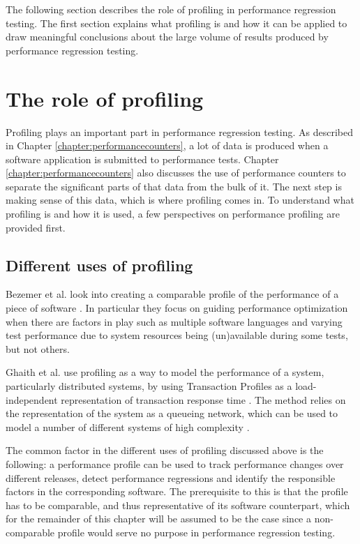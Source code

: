 The following section describes the role of profiling in performance regression testing. The first section explains what profiling is and how it can be applied to draw meaningful conclusions about the large volume of results produced by performance regression testing.

\section{The role of profiling}
Profiling plays an important part in performance regression testing. As described in Chapter \ref{chapter:performancecounters}, a lot of data is produced when a software application is submitted to performance tests. Chapter \ref{chapter:performancecounters} also discusses the use of performance counters to separate the significant parts of that data from the bulk of it. The next step is making sense of this data, which is where profiling comes in. To understand what profiling is and how it is used, a few perspectives on performance profiling are provided first.

\subsection{Different uses of profiling}
Bezemer et al. look into creating a comparable profile of the performance of a piece of software \cite{io_regressions}. In particular they focus on guiding performance optimization when there are factors in play such as multiple software languages and varying test performance due to system resources being (un)available during some tests, but not others.

Ghaith et al. use profiling as a way to model the performance of a system, particularly distributed systems, by using Transaction Profiles as a load-independent representation of transaction response time \cite{profile_based_detection}. The method relies on the representation of the system as a queueing network, which can be used to model a number of different systems of high complexity \cite{performance_puzzles}.

The common factor in the different uses of profiling discussed above is the following: a performance profile can be used to track performance changes over different releases, detect performance regressions and identify the responsible factors in the corresponding software. The prerequisite to this is that the profile has to be comparable, and thus representative of its software counterpart, which for the remainder of this chapter will be assumed to be the case since a non-comparable profile would serve no purpose in performance regression testing.


